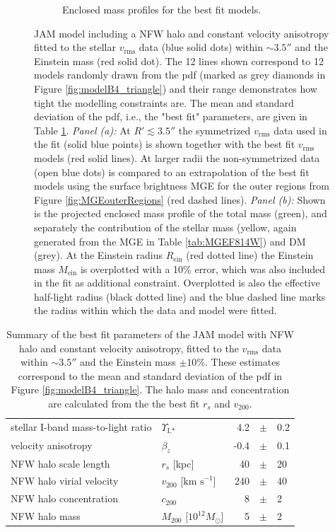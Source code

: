 \documentclass[useAMS,usenatbib]{mnras}
\begin{document}
\begin{figure}
\begin{subfigure}{.48\textwidth}
  \caption{Enclosed mass profiles for the best fit models.}
  \label{fig:modelB4_enclMass}
\end{subfigure}
\caption{JAM model including a NFW halo and constant velocity anisotropy fitted to the stellar $v_\text{rms}$ data (blue solid dots) within $\sim3.5''$ and the Einstein mass (red solid dot). The 12 lines shown correspond to 12 models randomly drawn from the pdf (marked as grey diamonds in Figure \ref{fig:modelB4_triangle}) and their range demonstrates how tight the modelling constraints are. The mean and standard deviation of the pdf, i.e., the "best fit" parameters, are given in Table \ref{tab:modelB4_bestfit}. \emph{Panel (a):} At $R'\lesssim 3.5''$ the symmetrized $v_\text{rms}$ data used in the fit (solid blue points) is shown together with the best fit $v_\text{rms}$ models (red solid lines). At larger radii the non-symmetrized data (open blue dots) is compared to an extrapolation of the best fit models using the surface brightness MGE for the outer regions from Figure \ref{fig:MGEouterRegions} (red dashed lines). \emph{Panel (b):} Shown is the projected enclosed mass profile of the total mass (green), and separately the contribution of the stellar mass (yellow, again generated from the MGE in Table \ref{tab:MGEF814W}) and DM (grey). At the Einstein radius $R_\text{ein}$ (red dotted line) the Einstein mass $M_\text{ein}$ is overplotted with a 10\% error, which was also included in the fit as additional constraint. Overplotted is also the effective half-light radius (black dotted line) and the blue dashed line marks the radius within which the data and model were fitted.}
\label{fig:modelB4_models}
\end{figure}

\begin{table}
\centering
\begin{tabular}{llrcl}
\hline
stellar I-band mass-to-light ratio & $\Upsilon_\text{I,*}$ & 4.2 & $\pm$ & 0.2\\
velocity anisotropy & $\beta_z$ & -0.4 & $\pm$ & 0.1 \\
NFW halo scale length & $r_s$ [kpc] & 40 & $\pm$ & 20\\
NFW halo virial velocity & $v_{200}$ [$\text{km s}^{-1}$] & 240 & $\pm$ & 40\\
NFW halo concentration & $c_{200}$ & 8 & $\pm$ & 2 \\
NFW halo mass & $M_{200}$ [$10^{12} M_\odot$] & 5 & $\pm$ & 2\\
\hline
\end{tabular}
\caption{Summary of the best fit parameters of the JAM model with NFW halo and constant velocity anisotropy, fitted to the $v_\text{rms}$ data within $\sim 3.5''$ and the Einstein mass $\pm10\%$. These estimates correspond to the mean and standard deviation of the pdf in Figure \ref{fig:modelB4_triangle}. The halo mass and concentration are calculated from the the best fit $r_s$ and $v_{200}$.}
\label{tab:modelB4_bestfit}
\end{table}
\end{document}

